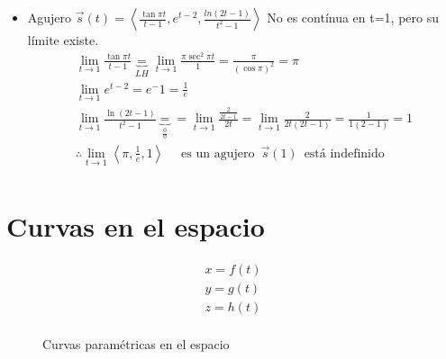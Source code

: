 \documentclass{article}
\begin{document}
\begin{itemize}
    \item Agujero $\vec{s}(t) = \left\langle \frac{\tan \pi t }{t-1} , e^{t-2}, \frac{ln(2t-1)}{t^2-1}  \right\rangle $ \newline 
     No es contínua en t=1, pero su límite existe.
     \begin{align*}
         \lim_{t \to 1} \frac{\tan \pi t}{t-1} \underbrace{=}_{LH} \lim_{t \to 1} \frac{\pi \sec^2 \pi t }{1} = \frac{\pi}{(\cos \pi)^2} = \pi \\ 
        \lim_{t \to 1} e^{t-2 } = e^-1 = \frac{1}{e} \\ 
        \lim_{t \to 1} \frac{\ln(2t-1)}{t^2-1} \underbrace{=}_{\frac{0}{0}} = \lim_{t \to 1} \frac{\frac{2}{2t-1} }{2t} = \lim_{t \to 1} \frac{2}{2t(2t-1)} = \frac{1}{1(2-1)} = 1 \\ 
        \therefore \lim_{t \to 1} \left\langle \pi, \frac{1}{e}, 1 \right\rangle \quad \text{  es un agujero   } \, \vec{s}(1) \, \text{  está indefinido  } \\   
     \end{align*}
\end{itemize}


\section{Curvas en el espacio}

\begin{align*}
    x = f(t) \\ 
    y = g(t) \\ 
    z = h(t) \\ 
\end{align*}
\begin{figure}[htbp]
    \centering
    \caption{Curvas paramétricas en el espacio}
    \label{}
\end{figure}

\end{document}
